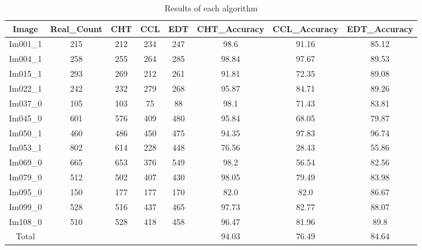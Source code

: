 \begin{table}[H]
\centering
\begin{tabular}{|c|c|c|c|c|c|c|c|}
\hline
 \textbf{Image} & \textbf{Real\_Count} & \textbf{CHT} & \textbf{CCL} & \textbf{EDT} & \textbf{CHT\_Accuracy} & \textbf{CCL\_Accuracy} & \textbf{EDT\_Accuracy} \\ \hline
 Im001\_1 & 215 & 212 & 234 & 247 & 98.6 & 91.16 & 85.12 \\ 
 Im004\_1 & 258 & 255 & 264 & 285 & 98.84 & 97.67 & 89.53 \\ 
 Im015\_1 & 293 & 269 & 212 & 261 & 91.81 & 72.35 & 89.08 \\ 
 Im022\_1 & 242 & 232 & 279 & 268 & 95.87 & 84.71 & 89.26 \\ 
 Im037\_0 & 105 & 103 & 75 & 88 & 98.1 & 71.43 & 83.81 \\ 
 Im045\_0 & 601 & 576 & 409 & 480 & 95.84 & 68.05 & 79.87 \\ 
 Im050\_1 & 460 & 486 & 450 & 475 & 94.35 & 97.83 & 96.74 \\ 
 Im053\_1 & 802 & 614 & 228 & 448 & 76.56 & 28.43 & 55.86 \\ 
 Im069\_0 & 665 & 653 & 376 & 549 & 98.2 & 56.54 & 82.56 \\ 
 Im079\_0 & 512 & 502 & 407 & 430 & 98.05 & 79.49 & 83.98 \\ 
 Im095\_0 & 150 & 177 & 177 & 170 & 82.0 & 82.0 & 86.67 \\ 
 Im099\_0 & 528 & 516 & 437 & 465 & 97.73 & 82.77 & 88.07 \\ 
 Im108\_0 & 510 & 528 & 418 & 458 & 96.47 & 81.96 & 89.8 \\ \hline
 Total &  &   &   &   & 94.03 & 76.49 & 84.64 \\ 

\hline
\end{tabular}
\caption{Results of each algorithm}
\label{Results of each algorithm}
\end{table}

